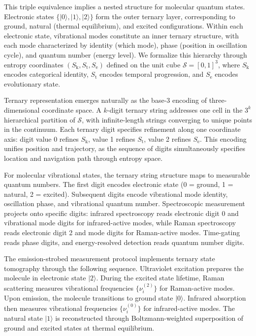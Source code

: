 \documentclass[twocolumn,10pt]{article}
\newcommand{\Sk}{S_{\text{k}}}
\newcommand{\St}{S_{\text{t}}}
\newcommand{\Se}{S_{\text{e}}}
\newcommand{\Sspace}{\mathcal{S}}
\begin{document}
This triple equivalence implies a nested structure for molecular quantum states. Electronic states $\{|0\rangle, |1\rangle, |2\rangle\}$ form the outer ternary layer, corresponding to ground, natural (thermal equilibrium), and excited configurations. Within each electronic state, vibrational modes constitute an inner ternary structure, with each mode characterized by identity (which mode), phase (position in oscillation cycle), and quantum number (energy level). We formalize this hierarchy through entropy coordinates $(\Sk, \St, \Se)$ defined on the unit cube $\Sspace = [0,1]^3$, where $\Sk$ encodes categorical identity, $\St$ encodes temporal progression, and $\Se$ encodes evolutionary state.

Ternary representation emerges naturally as the base-3 encoding of three-dimensional coordinate space. A $k$-digit ternary string addresses one cell in the $3^k$ hierarchical partition of $\Sspace$, with infinite-length strings converging to unique points in the continuum. Each ternary digit specifies refinement along one coordinate axis: digit value 0 refines $\Sk$, value 1 refines $\St$, value 2 refines $\Se$. This encoding unifies position and trajectory, as the sequence of digits simultaneously specifies location and navigation path through entropy space.

For molecular vibrational states, the ternary string structure maps to measurable quantum numbers. The first digit encodes electronic state (0 = ground, 1 = natural, 2 = excited). Subsequent digits encode vibrational mode identity, oscillation phase, and vibrational quantum number. Spectroscopic measurement projects onto specific digits: infrared spectroscopy reads electronic digit 0 and vibrational mode digits for infrared-active modes, while Raman spectroscopy reads electronic digit 2 and mode digits for Raman-active modes. Time-gating reads phase digits, and energy-resolved detection reads quantum number digits.

The emission-strobed measurement protocol implements ternary state tomography through the following sequence. Ultraviolet excitation prepares the molecule in electronic state $|2\rangle$. During the excited state lifetime, Raman scattering measures vibrational frequencies $\{\nu_i^{(2)}\}$ for Raman-active modes. Upon emission, the molecule transitions to ground state $|0\rangle$. Infrared absorption then measures vibrational frequencies $\{\nu_i^{(0)}\}$ for infrared-active modes. The natural state $|1\rangle$ is reconstructed through Boltzmann-weighted superposition of ground and excited states at thermal equilibrium.
\end{document}
